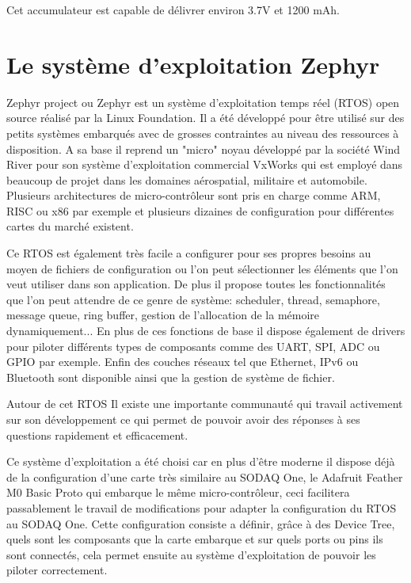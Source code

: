Cet accumulateur est capable de délivrer environ 3.7V et 1200 mAh.


\section{Le système d'exploitation Zephyr}

Zephyr project ou Zephyr est un système d'exploitation temps réel (RTOS) open source réalisé par la Linux Foundation. Il a été développé pour être utilisé sur des petits systèmes embarqués avec de grosses contraintes au niveau des ressources à disposition. A sa base il reprend un "micro" noyau développé par la société Wind River pour son système d'exploitation commercial VxWorks qui est employé dans beaucoup de projet dans les domaines aérospatial, militaire et automobile.
Plusieurs architectures de micro-contrôleur sont pris en charge comme ARM, RISC ou x86 par exemple et plusieurs dizaines de configuration pour différentes cartes du marché existent. 

Ce RTOS est également très facile a configurer pour ses propres besoins au moyen de fichiers de configuration ou l'on peut sélectionner les éléments que l'on veut utiliser dans son application. De plus il propose toutes les fonctionnalités que l'on peut attendre de ce genre de système: scheduler, thread, semaphore, message queue, ring buffer, gestion de l'allocation de la mémoire dynamiquement...
En plus de ces fonctions de base il dispose également de drivers pour piloter différents types de composants comme des UART, SPI, ADC ou GPIO par exemple. Enfin des couches réseaux tel que Ethernet, IPv6 ou Bluetooth sont disponible ainsi que la gestion de système de fichier. \cite{zephyr_web}

Autour de cet RTOS Il existe une importante communauté qui travail activement sur son développement ce qui permet de pouvoir avoir des réponses à ses questions rapidement et efficacement.

Ce système d'exploitation a été choisi car en plus d'être moderne il dispose déjà de la configuration d'une carte très similaire au SODAQ One, le Adafruit Feather M0 Basic Proto qui embarque le même micro-contrôleur, ceci facilitera passablement le travail de modifications pour adapter la configuration du RTOS au SODAQ One. Cette configuration consiste a définir, grâce à des Device Tree, quels sont les composants que la carte embarque et sur quels ports ou pins ils sont connectés, cela permet ensuite au système d'exploitation de pouvoir les piloter correctement.

